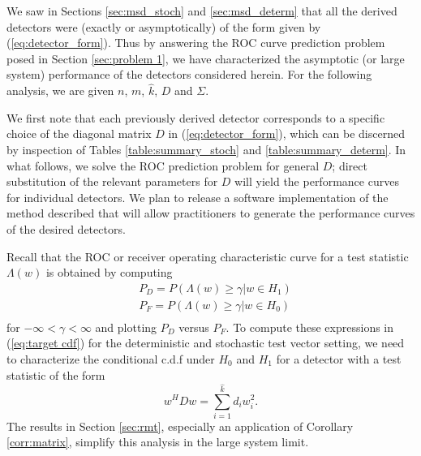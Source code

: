 We saw in Sections \ref{sec:msd_stoch} and \ref{sec:msd_determ} that all the derived detectors were (exactly or asymptotically) of the form given by (\ref{eq:detector_form}). Thus by answering the ROC curve prediction problem posed in Section \ref{sec:problem 1}, we have characterized the asymptotic (or large system) performance of the detectors considered herein. For the following analysis, we are given $n$, $m$, $\widehat{k}$, $D$ and $\Sigma$.

We first note that each previously derived detector corresponds to a specific choice of the diagonal matrix $D$ in (\ref{eq:detector_form}), which can be discerned by inspection of Tables \ref{table:summary_stoch} and \ref{table:summary_determ}. In what follows, we solve the ROC prediction problem for general $D$; direct substitution of the relevant parameters for $D$ will yield the performance curves for individual detectors. We plan to release a software implementation of the method described that will allow practitioners to generate the performance curves of the desired detectors.

Recall that the ROC or receiver operating characteristic curve \cite{fawcett2006introduction} for a test statistic $\Lambda(w)$ is obtained by computing
\begin{equation}
\begin{aligned}\label{eq:target cdf}
&P_D = P(\Lambda(w) \geq \gamma| w\in H_1)\\
&P_F = P(\Lambda(w) \geq \gamma| w\in H_0)\\
\end{aligned}
\end{equation}
for $-\infty<\gamma<\infty$ and plotting $P_D$ versus $P_F$. To compute these expressions in (\ref{eq:target cdf}) for the deterministic and stochastic test vector setting, we need to characterize the conditional c.d.f under $H_0$ and $H_1$ for a detector with a test statistic of the form
\begin{equation*}
w^HDw=\sum_{i=1}^{\widehat{k}}d_i w_i^2.
\end{equation*}
The results in Section \ref{sec:rmt}, especially an application of Corollary \ref{corr:matrix}, simplify this analysis in the large system limit.

